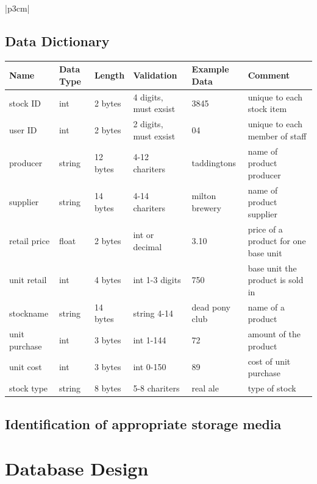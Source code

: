 \begin{center}
\begin{tabular}{|p{3cm}|}
\subsection{Data Dictionary}
\begin{center}
\begin{tabular}{|p{2cm}|p{1cm}|p{1.5cm}|p{2.5cm}|p{2.5cm}|p{3cm}|}
    \hline
    \textbf{Name} & \textbf{Data Type} & \textbf{Length} & \textbf{Validation} & \textbf{Example Data} & \textbf{Comment} \\ \hline
	stock ID & int & 2 bytes & 4 digits, must exsist & 3845 & unique to each stock item\\ \hline
	user ID & int & 2 bytes & 2 digits, must exsist & 04 & unique to each member of staff\\ \hline
	producer & string & 12 bytes & 4-12 chariters & taddingtons & name of product producer\\ \hline
	supplier & string & 14 bytes & 4-14 chariters & milton brewery & name of product supplier \\ \hline
	retail price & float & 2 bytes & int or decimal & 3.10 & price of a product for one base unit\\ \hline
	unit retail & int & 4 bytes & int 1-3 digits & 750 & base unit the product is sold in\\ \hline
	stockname & string & 14 bytes & string 4-14 & dead pony club & name of a product\\ \hline
	unit purchase & int & 3 bytes & int 1-144 & 72 & amount of the product\\ \hline
	unit cost & int & 3 bytes & int 0-150 & 89 & cost of unit purchase\\ \hline
	stock type & string & 8 bytes & 5-8 chariters & real ale & type of stock\\ \hline
	 
\end{tabular}
\label{tab:range_examples}
\end{center}

\subsection{Identification of appropriate storage media}

  


\section{Database Design}


\end{tabular}
\end{center}
